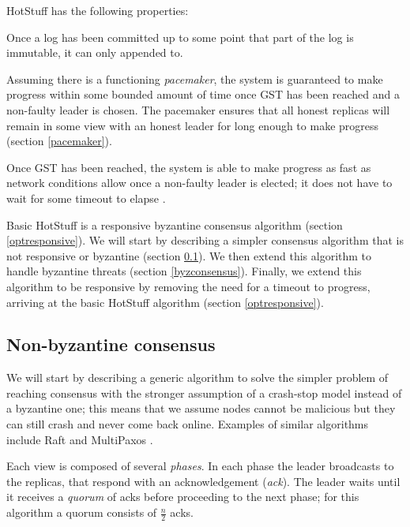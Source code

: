 HotStuff has the following properties:

\begin{property}[Safety] \label{safetyproperty}
	Once a log has been committed up to some point that part of the log is immutable, it can only appended to.
\end{property}

\begin{property}[Liveness] \label{livenessproperty}
	Assuming there is a functioning \textit{pacemaker}, the system is guaranteed to make progress within some bounded amount of time once GST has been reached and a non-faulty leader is chosen. The pacemaker ensures that all honest replicas will remain in some view with an honest leader for long enough to make progress (section \ref{pacemaker}).
\end{property}

\begin{property} \label{optresponsiveproperty}
	Once GST has been reached, the system is able to make progress as fast as network conditions allow once a non-faulty leader is elected; it does not have to wait for some timeout to elapse \cite{passThunderellaBlockchainsOptimistic2018}.
\end{property}

Basic HotStuff is a responsive byzantine consensus algorithm (section \ref{optresponsive}). We will start by describing a simpler consensus algorithm that is not responsive or byzantine (section \ref{nonbyzconsensus}). We then extend this algorithm to handle byzantine threats (section \ref{byzconsensus}). Finally, we extend this algorithm to be responsive by removing the need for a timeout to progress, arriving at the basic HotStuff algorithm (section \ref{optresponsive}).

\subsection{Non-byzantine consensus} \label{nonbyzconsensus}
We will start by describing a generic algorithm to solve the simpler problem of reaching consensus with the stronger assumption of a crash-stop model instead of a byzantine one; this means that we assume nodes cannot be malicious but they can still crash and never come back online. Examples of similar algorithms include Raft \cite{ongaroSearchUnderstandableConsensus2014} and MultiPaxos \cite{lamportParttimeParliament1998, lamportPaxosMadeSimple2001}.

Each view is composed of several \textit{phases}. In each phase the leader broadcasts to the replicas, that respond with an acknowledgement (\textit{ack}). The leader waits until it receives a \textit{quorum} of acks before proceeding to the next phase; for this algorithm a quorum consists of $\frac{n}{2}$ acks.

